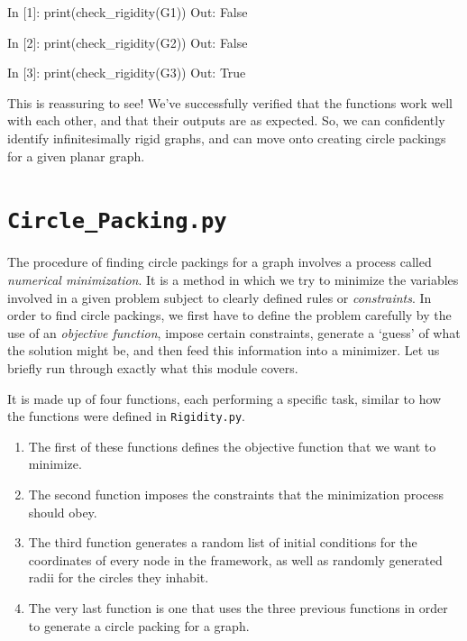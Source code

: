 \begin{code}
    In [1]: print(check_rigidity(G1))
    Out: False 
    
    In [2]: print(check_rigidity(G2))
    Out: False
    
    In [3]: print(check_rigidity(G3))
    Out: True
\end{code}

\begin{flushleft}
This is reassuring to see! We've successfully verified that the functions work well with each other, and that their outputs are as expected. So, we can confidently identify infinitesimally rigid graphs, and can move onto creating circle packings for a given planar graph. 
\end{flushleft}

\section{\texttt{Circle\_Packing.py}}

\begin{flushleft}
The procedure of finding circle packings for a graph involves a process called \textit{numerical minimization}. It is a method in which we try to minimize the variables involved in a given problem subject to clearly defined rules or \textit{constraints}. In order to find circle packings, we first have to define the problem carefully by the use of an \textit{objective function}, impose certain constraints, generate a `guess' of what the solution might be, and then feed this information into a minimizer. Let us briefly run through exactly what this module covers. 
\end{flushleft}

\begin{flushleft}
It is made up of four functions, each performing a specific task, similar to how the functions were defined in \texttt{Rigidity.py}. 
\begin{enumerate}
    \item The first of these functions defines the objective function that we want to minimize.
    \vspace{-3mm}
    \item The second function imposes the constraints that the minimization process should obey. 
    \vspace{-3mm}
    \item The third function generates a random list of initial conditions for the coordinates of every node in the framework, as well as randomly generated radii for the circles they inhabit.
    \vspace{-3mm}
    \item The very last function is one that uses the three previous functions in order to generate a circle packing for a graph.
\end{enumerate}
\end{flushleft}

